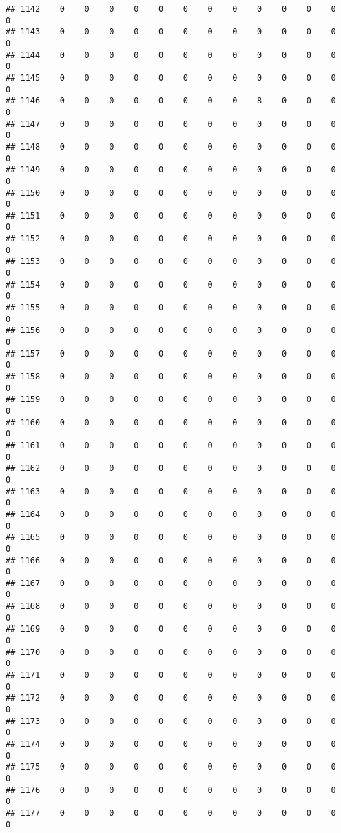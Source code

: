 \documentclass[]{article}
\begin{document}
\begin{verbatim}
## 1142    0    0    0    0    0    0    0    0    0    0    0    0    0
## 1143    0    0    0    0    0    0    0    0    0    0    0    0    0
## 1144    0    0    0    0    0    0    0    0    0    0    0    0    0
## 1145    0    0    0    0    0    0    0    0    0    0    0    0    0
## 1146    0    0    0    0    0    0    0    0    8    0    0    0    0
## 1147    0    0    0    0    0    0    0    0    0    0    0    0    0
## 1148    0    0    0    0    0    0    0    0    0    0    0    0    0
## 1149    0    0    0    0    0    0    0    0    0    0    0    0    0
## 1150    0    0    0    0    0    0    0    0    0    0    0    0    0
## 1151    0    0    0    0    0    0    0    0    0    0    0    0    0
## 1152    0    0    0    0    0    0    0    0    0    0    0    0    0
## 1153    0    0    0    0    0    0    0    0    0    0    0    0    0
## 1154    0    0    0    0    0    0    0    0    0    0    0    0    0
## 1155    0    0    0    0    0    0    0    0    0    0    0    0    0
## 1156    0    0    0    0    0    0    0    0    0    0    0    0    0
## 1157    0    0    0    0    0    0    0    0    0    0    0    0    0
## 1158    0    0    0    0    0    0    0    0    0    0    0    0    0
## 1159    0    0    0    0    0    0    0    0    0    0    0    0    0
## 1160    0    0    0    0    0    0    0    0    0    0    0    0    0
## 1161    0    0    0    0    0    0    0    0    0    0    0    0    0
## 1162    0    0    0    0    0    0    0    0    0    0    0    0    0
## 1163    0    0    0    0    0    0    0    0    0    0    0    0    0
## 1164    0    0    0    0    0    0    0    0    0    0    0    0    0
## 1165    0    0    0    0    0    0    0    0    0    0    0    0    0
## 1166    0    0    0    0    0    0    0    0    0    0    0    0    0
## 1167    0    0    0    0    0    0    0    0    0    0    0    0    0
## 1168    0    0    0    0    0    0    0    0    0    0    0    0    0
## 1169    0    0    0    0    0    0    0    0    0    0    0    0    0
## 1170    0    0    0    0    0    0    0    0    0    0    0    0    0
## 1171    0    0    0    0    0    0    0    0    0    0    0    0    0
## 1172    0    0    0    0    0    0    0    0    0    0    0    0    0
## 1173    0    0    0    0    0    0    0    0    0    0    0    0    0
## 1174    0    0    0    0    0    0    0    0    0    0    0    0    0
## 1175    0    0    0    0    0    0    0    0    0    0    0    0    0
## 1176    0    0    0    0    0    0    0    0    0    0    0    0    0
## 1177    0    0    0    0    0    0    0    0    0    0    0    0    0

\end{verbatim}
\end{document}
